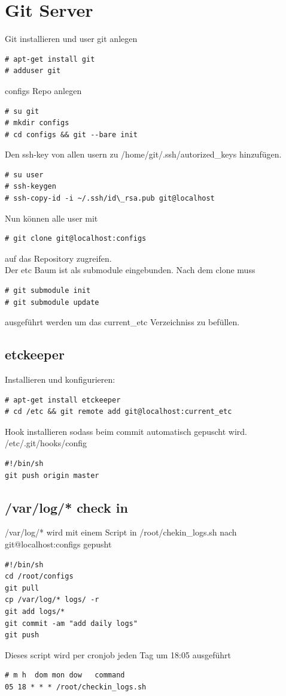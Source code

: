 \section{Git Server}
Git installieren und user git anlegen
\begin{lstlisting}[style=Bash]
# apt-get install git
# adduser git
\end{lstlisting}
configs Repo anlegen
\begin{lstlisting}[style=Bash]
# su git
# mkdir configs
# cd configs && git --bare init
\end{lstlisting}
Den ssh-key von allen usern zu /home/git/.ssh/autorized\_keys hinzufügen.
\begin{lstlisting}[style=Bash]
# su user
# ssh-keygen
# ssh-copy-id -i ~/.ssh/id\_rsa.pub git@localhost
\end{lstlisting}
Nun können alle user mit
\begin{lstlisting}[style=Bash]
# git clone git@localhost:configs
\end{lstlisting}
auf das Repository zugreifen.\\
Der etc Baum ist als submodule eingebunden. Nach dem clone muss
\begin{lstlisting}[style=Bash]
# git submodule init
# git submodule update
\end{lstlisting}
ausgeführt werden um das current\_etc Verzeichniss zu befüllen.
\subsection{etckeeper}
Installieren und konfigurieren:
\begin{lstlisting}[style=Bash]
# apt-get install etckeeper
# cd /etc && git remote add git@localhost:current_etc
\end{lstlisting}
Hook installieren sodass beim commit automatisch gepuscht wird.
/etc/.git/hooks/config
\begin{lstlisting}[style=Bash]
#!/bin/sh
git push origin master
\end{lstlisting}

\subsection{/var/log/* check in}
/var/log/* wird mit einem Script in /root/chekin\_logs.sh nach git@localhost:configs gepusht
\begin{lstlisting}[style=Bash]
#!/bin/sh
cd /root/configs
git pull
cp /var/log/* logs/ -r
git add logs/*
git commit -am "add daily logs"
git push
\end{lstlisting}
Dieses script wird per cronjob jeden Tag um 18:05 ausgeführt
\begin{lstlisting}[style=Bash]
# m h  dom mon dow   command
05 18 * * * /root/checkin_logs.sh
\end{lstlisting}
